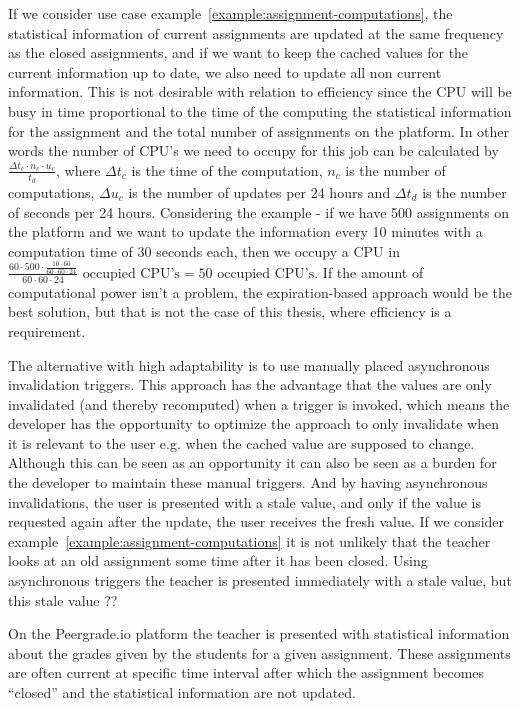If we consider use case example~\ref{example:assignment-computations}, the statistical information of current assignments are updated at the same frequency as the closed assignments, and if we want to keep the cached values for the current information up to date, we also need to update all non current information. This is not desirable with relation to efficiency since the CPU will be busy in time proportional to the time of the computing the statistical information for the assignment and the total number of assignments on the platform. In other words the number of CPU's we need to occupy for this job can be calculated by $\frac{\Delta t_c \cdot n_c \cdot u_c}{t_d}$, where $\Delta t_c$ is the time of the computation, $n_c$ is the number of computations, $\Delta u_c$ is the number of updates per 24 hours and $\Delta t_d$ is the number of seconds per 24 hours. Considering the example - if we have 500 assignments on the platform and we want to update the information every 10 minutes with a computation time of 30 seconds each, then we occupy a CPU in $\frac{60 \cdot 500 \cdot \frac{10 \cdot 60}{60 \cdot 60 \cdot 24}}{60 \cdot 60 \cdot 24}\text{ occupied CPU's} = 50\text{ occupied CPU's}$. If the amount of computational power isn't a problem, the expiration-based approach would be the best solution, but that is not the case of this thesis, where efficiency is a requirement.

The alternative with high adaptability is to use manually placed asynchronous invalidation triggers. This approach has the advantage that the values are only invalidated (and thereby recomputed) when a trigger is invoked, which means the developer has the opportunity to optimize the approach to only invalidate when it is relevant to the user e.g. when the cached value are supposed to change. Although this can be seen as an opportunity it can also be seen as a burden for the developer to maintain these manual triggers. And by having asynchronous invalidations, the user is presented with a stale value, and only if the value is requested again after the update, the user receives the fresh value. If we consider example~\ref{example:assignment-computations} it is not unlikely that the teacher looks at an old assignment some time after it has been closed. Using asynchronous triggers the teacher is presented immediately with a stale value, but this stale value ??


\begin{example}
\label{example:assignment-computations}
On the Peergrade.io platform the teacher is presented with statistical information about the grades given by the students for a given assignment. These assignments are often current at specific time interval after which the assignment becomes ``closed'' and the statistical information are not updated.
\end{example}


